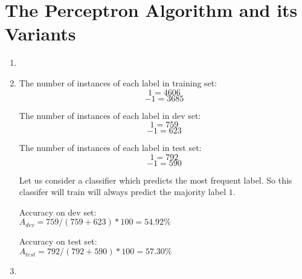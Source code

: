 \section{The Perceptron Algorithm and its Variants}\label{sec:q3}

\begin{enumerate}

	\item
	
	\item
	The number of instances of each label in training set:
	$$1 	= 4606 $$
	$$-1 = 3685 $$
	
	The number of instances of each label in dev set:
	$$1 	= 759 $$
	$$-1 = 623 $$
	
	The number of instances of each label in test set:
	$$1 	= 792 $$
	$$-1 = 590 $$
	
	Let us consider a classifier which predicts the most frequent label. So this classifer will train will always predict the majority label $1$.
	
	Accuracy on dev set: \\
	$A_{dev} = 759/(759+623)*100 = 54.92 \%$
	
	Accuracy on test set: \\
	$A_{test} = 792/(792+590)*100 = 57.30 \%$
	
	\item
	

\end{enumerate}